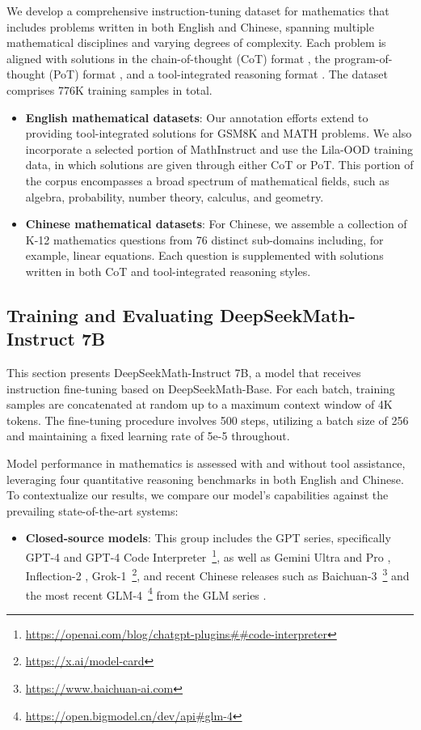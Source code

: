We develop a comprehensive instruction-tuning dataset for mathematics that includes problems written in both English and Chinese, spanning multiple mathematical disciplines and varying degrees of complexity. Each problem is aligned with solutions in the chain-of-thought (CoT) format \citep{cot}, the program-of-thought (PoT) format \citep{pot,pal}, and a tool-integrated reasoning format \citep{tora}. The dataset comprises 776K training samples in total.

\begin{itemize}[topsep=0pt]
    \item \textbf{English mathematical datasets}: Our annotation efforts extend to providing tool-integrated solutions for GSM8K and MATH problems. We also incorporate a selected portion of MathInstruct \citep{MathInstruct} and use the Lila-OOD \citep{lila} training data, in which solutions are given through either CoT or PoT. This portion of the corpus encompasses a broad spectrum of mathematical fields, such as algebra, probability, number theory, calculus, and geometry.
    \item \textbf{Chinese mathematical datasets}: For Chinese, we assemble a collection of K-12 mathematics questions from 76 distinct sub-domains including, for example, linear equations. Each question is supplemented with solutions written in both CoT and tool-integrated reasoning styles.
\end{itemize}

\subsection{Training and Evaluating DeepSeekMath-Instruct 7B}

This section presents DeepSeekMath-Instruct 7B, a model that receives instruction fine-tuning based on DeepSeekMath-Base. For each batch, training samples are concatenated at random up to a maximum context window of 4K tokens. The fine-tuning procedure involves 500 steps, utilizing a batch size of 256 and maintaining a fixed learning rate of 5e-5 throughout.

Model performance in mathematics is assessed with and without tool assistance, leveraging four quantitative reasoning benchmarks in both English and Chinese. To contextualize our results, we compare our model's capabilities against the prevailing state-of-the-art systems:

\begin{itemize}[topsep=0pt]
    \item \textbf{Closed-source models}: This group includes the GPT series, specifically GPT-4 \citep{gpt4} and GPT-4 Code Interpreter~\footnote{\url{https://openai.com/blog/chatgpt-plugins\#\#code-interpreter}}, as well as Gemini Ultra and Pro \citep{gemini}, Inflection-2 \citep{inflection-2}, Grok-1~\footnote{\url{https://x.ai/model-card}}, and recent Chinese releases such as Baichuan-3~\footnote{\url{https://www.baichuan-ai.com}} and the most recent GLM-4~\footnote{\url{https://open.bigmodel.cn/dev/api\#glm-4}} from the GLM series \citep{glm}.
\end{itemize}

